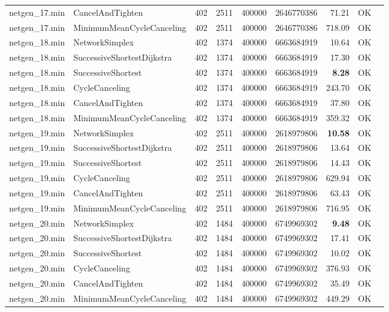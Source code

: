 \begin{longtable}{llrrrrrrl}
netgen\_17.min & CancelAndTighten & 402 & 2511 & 400000 & 2646770386 & 71.21 & OK \\
netgen\_17.min & MinimumMeanCycleCanceling & 402 & 2511 & 400000 & 2646770386 & 718.09 & OK \\
\midrule
netgen\_18.min & NetworkSimplex & 402 & 1374 & 400000 & 6663684919 & 10.64 & OK \\
netgen\_18.min & SuccessiveShortestDijkstra & 402 & 1374 & 400000 & 6663684919 & 17.30 & OK \\
netgen\_18.min & SuccessiveShortest & 402 & 1374 & 400000 & 6663684919 & \textbf{8.28} & OK \\
netgen\_18.min & CycleCanceling & 402 & 1374 & 400000 & 6663684919 & 243.70 & OK \\
netgen\_18.min & CancelAndTighten & 402 & 1374 & 400000 & 6663684919 & 37.80 & OK \\
netgen\_18.min & MinimumMeanCycleCanceling & 402 & 1374 & 400000 & 6663684919 & 359.32 & OK \\
\midrule
netgen\_19.min & NetworkSimplex & 402 & 2511 & 400000 & 2618979806 & \textbf{10.58} & OK \\
netgen\_19.min & SuccessiveShortestDijkstra & 402 & 2511 & 400000 & 2618979806 & 13.64 & OK \\
netgen\_19.min & SuccessiveShortest & 402 & 2511 & 400000 & 2618979806 & 14.43 & OK \\
netgen\_19.min & CycleCanceling & 402 & 2511 & 400000 & 2618979806 & 629.94 & OK \\
netgen\_19.min & CancelAndTighten & 402 & 2511 & 400000 & 2618979806 & 63.43 & OK \\
netgen\_19.min & MinimumMeanCycleCanceling & 402 & 2511 & 400000 & 2618979806 & 716.95 & OK \\
\midrule
netgen\_20.min & NetworkSimplex & 402 & 1484 & 400000 & 6749969302 & \textbf{9.48} & OK \\
netgen\_20.min & SuccessiveShortestDijkstra & 402 & 1484 & 400000 & 6749969302 & 17.41 & OK \\
netgen\_20.min & SuccessiveShortest & 402 & 1484 & 400000 & 6749969302 & 10.02 & OK \\
netgen\_20.min & CycleCanceling & 402 & 1484 & 400000 & 6749969302 & 376.93 & OK \\
netgen\_20.min & CancelAndTighten & 402 & 1484 & 400000 & 6749969302 & 35.49 & OK \\
netgen\_20.min & MinimumMeanCycleCanceling & 402 & 1484 & 400000 & 6749969302 & 449.29 & OK \\

\end{longtable}

